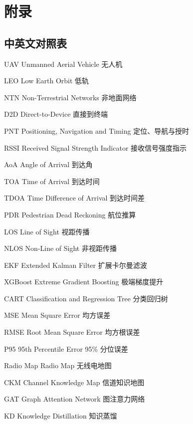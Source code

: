 \chapter{附\quad 录}
\section*{中英文对照表}
\begin{IEEEdescription}
	\item[UAV] Unmanned Aerial Vehicle \hfill 无人机
	\item[LEO] Low Earth Orbit \hfill 低轨
	\item[NTN] Non-Terrestrial Networks \hfill 非地面网络
	\item[D2D] Direct-to-Device \hfill 直接到终端
	\item[PNT] Positioning, Navigation and Timing \hfill 定位、导航与授时
	\item[RSSI] Received Signal Strength Indicator \hfill 接收信号强度指示
	\item[AoA] Angle of Arrival \hfill 到达角
	\item[TOA] Time of Arrival \hfill 到达时间
	\item[TDOA] Time Difference of Arrival \hfill 到达时间差
	\item[PDR] Pedestrian Dead Reckoning \hfill 航位推算
	\item[LOS] Line of Sight \hfill 视距传播
	\item[NLOS] Non-Line of Sight \hfill 非视距传播
		\item[EKF] Extended Kalman Filter \hfill 扩展卡尔曼滤波
		\item[XGBoost] Extreme Gradient Boosting \hfill 极端梯度提升
		\item[CART] Classification and Regression Tree \hfill 分类回归树
		\item[MSE] Mean Square Error \hfill 均方误差
		\item[RMSE] Root Mean Square Error \hfill 均方根误差
		\item[P95] 95th Percentile Error \hfill 95\% 分位误差
		\item[Radio Map] Radio Map \hfill 无线电地图
		\item[CKM] Channel Knowledge Map \hfill 信道知识地图
		\item[GAT] Graph Attention Network \hfill 图注意力网络
	\item[KD] Knowledge Distillation \hfill 知识蒸馏
\end{IEEEdescription}
